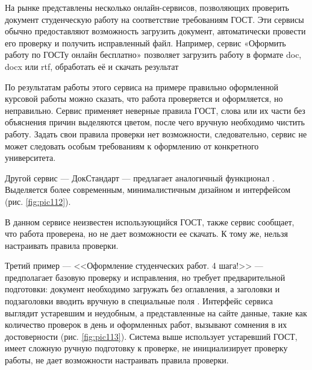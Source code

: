 \documentclass{report}
\begin{document}
На рынке представлены несколько онлайн-сервисов, позволяющих проверить документ студенческую работу на соответствие требованиям ГОСТ. Эти сервисы обычно предоставляют возможность загрузить документ, автоматически провести его проверку и получить исправленный файл. Например, сервис «Оформить работу по ГОСТу онлайн бесплатно»  позволяет загрузить работу в формате doc, docx или rtf, обработать её и скачать \break результат %

\break

По результатам работы этого сервиса на примере правильно оформленной курсовой работы можно сказать, что работа проверяется и оформляется, но неправильно. Сервис применяет неверные правила ГОСТ, слова или их части без объяснения причин выделяются цветом, после чего вручную необходимо чистить работу. Задать свои правила проверки нет возможности, следовательно, сервис не может следовать особым требованиям к оформлению от конкретного университета.

Другой сервис --- ДокСтандарт --- предлагает аналогичный \break функционал \cite{serv2}. Выделяется более современным, минималистичным дизайном и интерфейсом (рис. \ref{fig:pic112}).


В данном сервисе неизвестен использующийся ГОСТ, также сервис сообщает, что работа проверена, но не дает возможности ее скачать. К тому же, нельзя настраивать правила проверки.

Третий пример --- <<Оформление студенческих работ. 4 шага!>> --- предполагает базовую проверку и исправления, но требует предварительной подготовки: документ необходимо загружать без оглавления, а заголовки и подзаголовки вводить вручную в специальные поля \cite{serv3}. Интерфейс сервиса выглядит устаревшим и неудобным, а представленные на сайте данные, такие как количество проверок в день и оформленных работ, вызывают сомнения в их достоверности (рис. \ref{fig:pic113}). Система выше использует устаревший ГОСТ, имеет сложную ручную подготовку к проверке, не инициализирует проверку работы, не дает возможности настраивать правила проверки.

\end{document}

